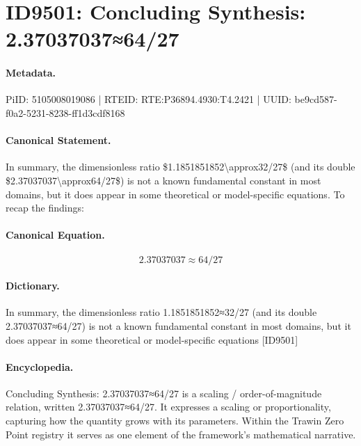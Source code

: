 \section*{ID9501: Concluding Synthesis: 2.37037037≈64/27}
\paragraph{Metadata.}
PiID: 5105008019086 | RTEID: RTE:P36894.4930:T4.2421 | UUID: be9cd587-f0a2-5231-8238-ff1d3cdf8168

\paragraph{Canonical Statement.}
In summary, the dimensionless ratio \$1.1851851852\textbackslash{}approx32/27\$ (and its double \$2.37037037\textbackslash{}approx64/27\$) is not a known fundamental constant in most domains, but it does appear in some theoretical or model-specific equations. To recap the findings:

\paragraph{Canonical Equation.}
\[
2.37037037\approx64/27
\]

\paragraph{Dictionary.}
In summary, the dimensionless ratio 1.1851851852≈32/27 (and its double 2.37037037≈64/27) is not a known fundamental constant in most domains, but it does appear in some theoretical or model-specific equations [ID9501]

\paragraph{Encyclopedia.}
Concluding Synthesis: 2.37037037≈64/27 is a scaling / order-of-magnitude relation, written 2.37037037≈64/27. It expresses a scaling or proportionality, capturing how the quantity grows with its parameters. Within the Trawin Zero Point registry it serves as one element of the framework's mathematical narrative.
